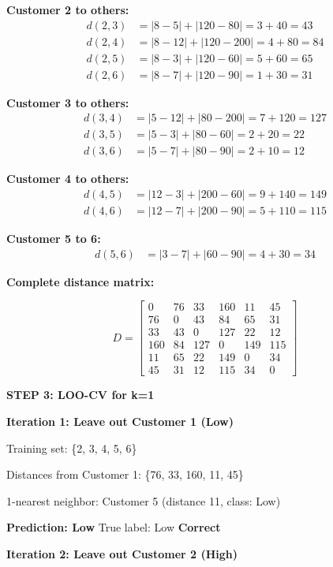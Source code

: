 \documentclass[12pt]{article}
\begin{document}
\begin{solution}
\textbf{Customer 2 to others:}
\begin{align*}
d(2,3) &= |8-5| + |120-80| = 3 + 40 = 43 \\
d(2,4) &= |8-12| + |120-200| = 4 + 80 = 84 \\
d(2,5) &= |8-3| + |120-60| = 5 + 60 = 65 \\
d(2,6) &= |8-7| + |120-90| = 1 + 30 = 31
\end{align*}

\textbf{Customer 3 to others:}
\begin{align*}
d(3,4) &= |5-12| + |80-200| = 7 + 120 = 127 \\
d(3,5) &= |5-3| + |80-60| = 2 + 20 = 22 \\
d(3,6) &= |5-7| + |80-90| = 2 + 10 = 12
\end{align*}

\textbf{Customer 4 to others:}
\begin{align*}
d(4,5) &= |12-3| + |200-60| = 9 + 140 = 149 \\
d(4,6) &= |12-7| + |200-90| = 5 + 110 = 115
\end{align*}

\textbf{Customer 5 to 6:}
\begin{align*}
d(5,6) &= |3-7| + |60-90| = 4 + 30 = 34
\end{align*}

\textbf{Complete distance matrix:}

\[
D = \begin{bmatrix}
0 & 76 & 33 & 160 & 11 & 45 \\
76 & 0 & 43 & 84 & 65 & 31 \\
33 & 43 & 0 & 127 & 22 & 12 \\
160 & 84 & 127 & 0 & 149 & 115 \\
11 & 65 & 22 & 149 & 0 & 34 \\
45 & 31 & 12 & 115 & 34 & 0
\end{bmatrix}
\]

\textbf{STEP 3: LOO-CV for k=1}

\textbf{Iteration 1: Leave out Customer 1 (Low)}

Training set: \{2, 3, 4, 5, 6\}

Distances from Customer 1: \{76, 33, 160, 11, 45\}

1-nearest neighbor: Customer 5 (distance 11, class: Low)

\textbf{Prediction: Low} \quad True label: Low \quad \checkmark \textbf{Correct}

\textbf{Iteration 2: Leave out Customer 2 (High)}


\end{solution}
\end{document}
